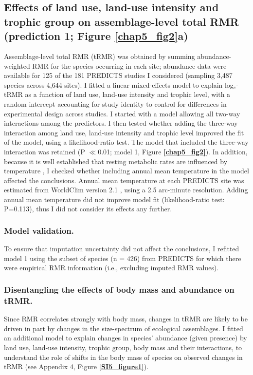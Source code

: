 \subsection{Effects of land use, land-use intensity and trophic group on assemblage-level total RMR (prediction 1; Figure \ref{chap5_fig2}a)}

Assemblage-level total RMR (tRMR) was obtained by summing abundance-weighted RMR for the species occurring in each site; abundance data were available for 125 of the 181 PREDICTS studies I considered (sampling 3,487 species across 4,644 sites). I fitted a linear mixed-effects model to explain log$_e$-tRMR as a function of land use, land-use intensity and trophic level, with a random intercept accounting for study identity to control for differences in experimental design across studies. I started with a model allowing all two-way interactions among the predictors. I then tested whether adding the three-way interaction among land use, land-use intensity and trophic level improved the fit of the model, using a likelihood-ratio test. The model that included the three-way interaction was retained (P $\ll$0.01; model 1, Figure \textbf{\ref{chap5_fig2}}). In addition, because it is well established that resting metabolic rates are influenced by temperature \citep{Clarke2004a}, I checked whether including annual mean temperature in the model affected the conclusions. Annual mean temperature at each PREDICTS site was estimated from WorldClim version 2.1 \citep{Fick2017}, using a 2.5 arc-minute resolution. Adding annual mean temperature did not improve model fit (likelihood-ratio test: P=0.113), thus I did not consider its effects any further.   

\subsubsection*{Model validation.}
To ensure that imputation uncertainty did not affect the conclusions, I refitted model 1 using the subset of species (n = 426) from PREDICTS for which there were empirical RMR information (i.e., excluding imputed RMR values). 

\subsubsection*{Disentangling the effects of body mass and abundance on tRMR.}
Since RMR correlates strongly with body mass, changes in tRMR are likely to be driven in part by changes in the size-spectrum of ecological assemblages. I fitted an additional model to explain changes in species' abundance (given presence) by land use, land-use intensity, trophic group, body mass and their interactions, to understand the role of shifts in the body mass of species on observed changes in tRMR (see Appendix 4, Figure \textbf{\ref{SI5_figure1}}).  

